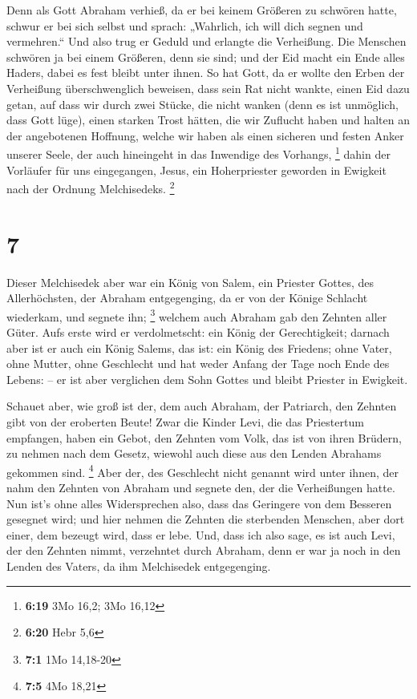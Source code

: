  Denn als Gott Abraham verhieß, da er bei keinem Größeren
zu schwören hatte, schwur er bei sich selbst  und sprach:
„Wahrlich, ich will dich segnen und vermehren.``  Und also
trug er Geduld und erlangte die Verheißung.  Die Menschen
schwören ja bei einem Größeren, denn sie sind; und der Eid macht ein
Ende alles Haders, dabei es fest bleibt unter ihnen.  So
hat Gott, da er wollte den Erben der Verheißung überschwenglich
beweisen, dass sein Rat nicht wankte, einen Eid dazu getan,
 auf dass wir durch zwei Stücke, die nicht wanken (denn es
ist unmöglich, dass Gott lüge), einen starken Trost hätten, die wir
Zuflucht haben und halten an der angebotenen Hoffnung, 
welche wir haben als einen sicheren und festen Anker unserer Seele, der
auch hineingeht in das Inwendige des Vorhangs, \footnote{\textbf{6:19}
  3Mo 16,2; 3Mo 16,12}  dahin der Vorläufer für uns
eingegangen, Jesus, ein Hoherpriester geworden in Ewigkeit nach der
Ordnung Melchisedeks. \footnote{\textbf{6:20} Hebr 5,6}

\hypertarget{section-3}{%
\section{7}\label{section-3}}

 Dieser Melchisedek aber war ein König von Salem, ein
Priester Gottes, des Allerhöchsten, der Abraham entgegenging, da er von
der Könige Schlacht wiederkam, und segnete ihn; \footnote{\textbf{7:1}
  1Mo 14,18-20}  welchem auch Abraham gab den Zehnten aller
Güter. Aufs erste wird er verdolmetscht: ein König der Gerechtigkeit;
darnach aber ist er auch ein König Salems, das ist: ein König des
Friedens;  ohne Vater, ohne Mutter, ohne Geschlecht und hat
weder Anfang der Tage noch Ende des Lebens: -- er ist aber verglichen
dem Sohn Gottes und bleibt Priester in Ewigkeit.

 Schauet aber, wie groß ist der, dem auch Abraham, der
Patriarch, den Zehnten gibt von der eroberten Beute!  Zwar
die Kinder Levi, die das Priestertum empfangen, haben ein Gebot, den
Zehnten vom Volk, das ist von ihren Brüdern, zu nehmen nach dem Gesetz,
wiewohl auch diese aus den Lenden Abrahams gekommen sind. \footnote{\textbf{7:5}
  4Mo 18,21}  Aber der, des Geschlecht nicht genannt wird
unter ihnen, der nahm den Zehnten von Abraham und segnete den, der die
Verheißungen hatte.  Nun ist's ohne alles Widersprechen
also, dass das Geringere von dem Besseren gesegnet wird; 
und hier nehmen die Zehnten die sterbenden Menschen, aber dort einer,
dem bezeugt wird, dass er lebe.  Und, dass ich also sage, es
ist auch Levi, der den Zehnten nimmt, verzehntet durch Abraham,
 denn er war ja noch in den Lenden des Vaters, da ihm
Melchisedek entgegenging.


